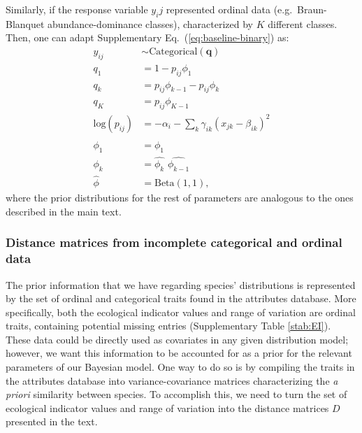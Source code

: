 \documentclass[11pt, a4paper]{article}
\begin{document}
Similarly, if the response variable $y_ij$ represented ordinal data (e.g.~Braun-Blanquet abundance-dominance classes), characterized by $K$ different classes. Then, one can adapt Supplementary Eq.~(\ref{eq:baseline-binary}) as:
\begin{equation}
\begin{split}
y_{ij} & \sim \text{Categorical}\left(\mathbf{q}\right) \\
q_{1} & = 1- p_{ij}\phi_1 \\
q_{k} & =  p_{ij}\phi_{k-1} -  p_{ij}\phi_{k} \\
q_{K} & =  p_{ij}\phi_{K-1} \\
\text{log}\left(p_{ij}\right) & = -\alpha_{i} - \sum_k \gamma_{ik} \left(x_{jk}-\beta_{ik}\right)^2 \\
\phi_1 & = \hat{\phi_1} \\
\phi_k & = \hat{\phi_k} \,\, \hat{\phi_{k-1}} \\
\hat{\phi} & = \text{Beta}(1,1),
\end{split}
\label{eq:baseline-categorical}
\end{equation}
where the prior distributions for the rest of parameters are analogous to the ones described in the main text.

\subsubsection*{Distance matrices from incomplete categorical and ordinal data}
The prior information that we have regarding species' distributions is represented by the set of ordinal and categorical traits found in the attributes database. More specifically, both the ecological indicator values and range of variation are ordinal traits, containing potential missing entries (Supplementary Table \ref{stab:EI}). These data could be directly used as covariates in any given distribution model; however, we want this information to be accounted for as a prior for the relevant parameters of our Bayesian model. One way to do so is by compiling the traits in the attributes database into variance-covariance matrices characterizing the \textit{a priori} similarity between species. To accomplish this, we need to turn the set of ecological indicator values and range of variation into the distance matrices $D$ presented in the text.
\end{document}
